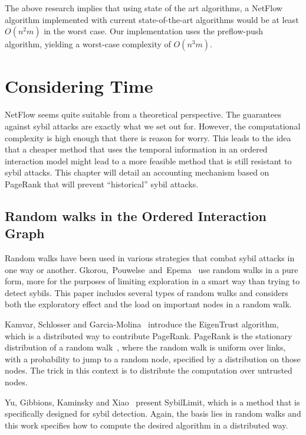 \documentclass[a4paper,11pt]{book}
\theoremstyle{definition}
\begin{document}
The above research implies that using state of the art algorithms, a NetFlow algorithm
implemented with current state-of-the-art algorithms would be at least $O(n^2m)$ in the
worst case. Our implementation uses the preflow-push algorithm, yielding a worst-case
complexity of $O(n^3m)$. 




\chapter{Considering Time}
\label{chap:temporal_pr}

NetFlow seems quite suitable from a theoretical perspective. The guarantees against sybil 
attacks are exactly what we set out for. However, the computational complexity is high
enough that there is reason for worry. This leads to the idea that a cheaper method that uses
the temporal information in an ordered interaction model might lead to a more feasible method
that is still resistant to sybil attacks. This chapter will detail an accounting mechanism
based on PageRank that will prevent ``historical'' sybil attacks.


\section{Random walks in the Ordered Interaction Graph}

Random walks have been used in various strategies that combat sybil attacks
in one way or another. Gkorou,~Pouwelse~and~Epema~\cite{gkorou2015trust} use random walks
in a pure form, more for the purposes of limiting exploration in
a smart way than trying to detect sybils. This paper includes several types
of random walks and considers both the exploratory effect and the
load on important nodes in a random walk.

Kamvar, Schlosser and Garcia-Molina~\cite{kamvar2003eigentrust} introduce
the EigenTrust algorithm, which is a distributed way to contribute PageRank.
PageRank is the stationary distribution of a random walk~\cite{page1999pagerank},
where the random walk is uniform over links, with a probability to jump to a
random node, specified by a distribution on those nodes. The trick in this context
is to distribute the computation over untrusted nodes. 

Yu, Gibbions, Kaminsky and Xiao~\cite{yu2008sybillimit} present SybilLimit, which
is a method that is specifically designed for sybil detection. Again, the basis
lies in random walks and this work specifies how to compute the desired
algorithm in a distributed way.
\end{document}
